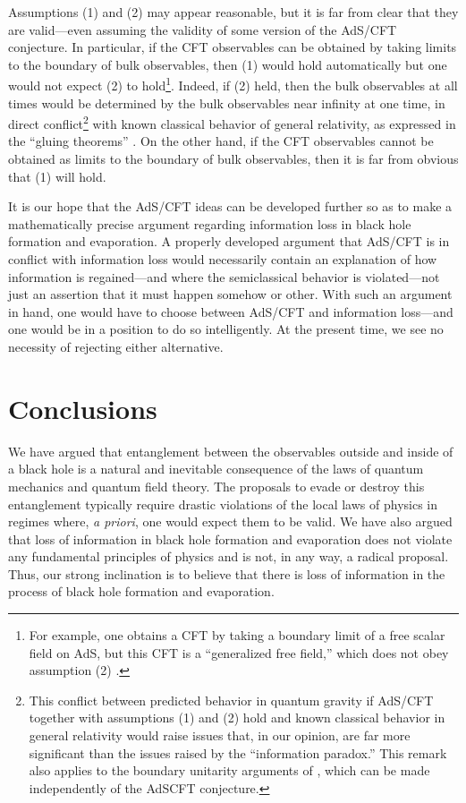 \documentclass[12pt,nofootinbib,amsmath,amssymb,amsfonts,aps,prd,groupedaddress]{revtex4-1}
\begin{document}
Assumptions (1) and (2) may appear reasonable, but it is far from clear that
they are valid---even assuming the validity of some version of the AdS/CFT
conjecture. In particular, if the CFT observables can be obtained by taking
limits to the boundary of bulk observables, then (1) would hold automatically
but one would not expect (2) to hold\footnote{For example, one obtains a CFT
by taking a boundary limit of a free scalar field on AdS, but this CFT is a ``generalized 
free field,'' which does not obey assumption (2) \cite{dr}.}. Indeed, if (2) held, then
the bulk observables at all times would be determined by the bulk observables
near infinity at one time, in direct conflict\footnote{This conflict between
predicted behavior in quantum gravity if AdS/CFT together with assumptions (1)
and (2) hold and known classical behavior in general relativity would raise
issues that, in our opinion, are far more significant than the issues raised by
the ``information paradox.'' This remark also applies to the boundary unitarity arguments of \cite{mar}, which can be made independently of the AdSCFT conjecture.} with known classical behavior of general
relativity, as expressed in the ``gluing theorems'' \cite{cip}. On the other hand, if
the CFT observables cannot be obtained as limits to the boundary of bulk
observables, then it is far from obvious that (1) will hold.

It is our hope that the AdS/CFT ideas can be developed further so as to make a
mathematically precise argument regarding information loss in black hole
formation and evaporation. A properly developed argument that AdS/CFT is in
conflict with information loss would necessarily contain an explanation of how
information is regained---and where the semiclassical behavior is violated---not
just an assertion that it must happen somehow or other. With such an argument in
hand, one would have to choose between AdS/CFT and information loss---and one
would be in a position to do so intelligently. At the present time, we see no
necessity of rejecting either alternative.


\section{Conclusions} \label{con}

We have argued that entanglement between the observables outside and inside of a
black hole is a natural and inevitable consequence of the laws of quantum
mechanics and quantum field theory. The proposals to evade or destroy this
entanglement typically require drastic violations of the local laws of physics
in regimes where, {\it a priori}, one would expect them to be valid. We have
also argued that loss of information in black hole formation and evaporation
does not violate any fundamental principles of physics and is not, in any way, a
radical proposal. Thus, our strong inclination is to believe that there is loss
of information in the process of black hole formation and evaporation. 
\end{document}

